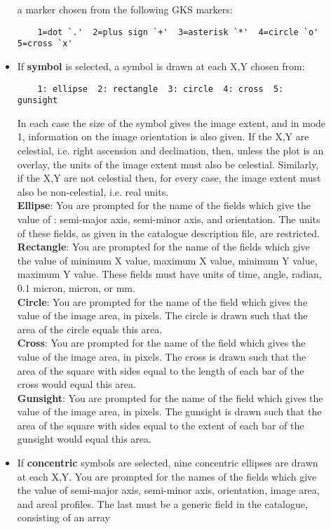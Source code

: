 \begin{description}
\begin{itemize}
a marker chosen from the following GKS markers:
\begin{verbatim}
    1=dot `.'  2=plus sign `+'  3=asterisk `*'  4=circle `o'  5=cross `x'
\end{verbatim}
\item If {\bf symbol} is selected, a symbol is drawn at each X,Y chosen from:
\begin{verbatim}
    1: ellipse  2: rectangle  3: circle  4: cross  5: gunsight
\end{verbatim}
In each case the size of the symbol gives the image extent, and in
mode 1, information on the image orientation is also given.  
If the X,Y are celestial, i.e. right ascension and declination, then, 
unless the plot is an overlay, the units of the image extent must also be
celestial. 
Similarly, if the X,Y are not celestial then, for every case, the image 
extent must also be non-celestial, i.e. real units.\\
{\bf Ellipse}: You are prompted for the name of the fields which give
the value of : semi-major axis, semi-minor axis, and orientation.
The units of these fields, as given in the catalogue description
file, are restricted.\\
{\bf Rectangle}: You are prompted for the name of the fields which
give the value of minimum X value, maximum X value, minimum Y
value, maximum Y value.  
These fields must have units of time, angle, radian, 0.1 micron, micron, 
or mm.\\
{\bf Circle}: You are prompted for the name of the field which
gives the value of the image area, in pixels.  
The circle is drawn such that the area of the circle equals this area.\\
{\bf Cross}: You are prompted for the name of the field which gives
the value of the image area, in pixels.  
The cross is drawn such that the area of the square with sides equal to 
the length of each bar of the cross would equal this area.\\
{\bf Gunsight}: You are prompted for the name of the field which gives
the value of the image area, in pixels.  
The gunsight is drawn such that the area of the square with sides equal 
to the extent of each bar of the gunsight would equal this area.
\item If {\bf concentric} symbols are selected, nine concentric ellipses 
are drawn at each X,Y.  
You are prompted for the names of the fields which give the value of 
semi-major axis, semi-minor axis, orientation, image area, and areal 
profiles.
The last must be a generic field in the catalogue, consisting of an array

\end{itemize}
\end{description}
